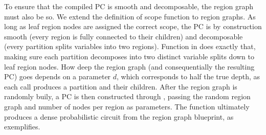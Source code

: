 To ensure that the compiled PC is smooth and decomposable, the region graph must also be so. We
extend the definition of scope function to region graphs. As long as leaf region nodes are assigned
the correct scope, the PC is by construction smooth (every region is fully connected to their
children) and decomposable (every partition splits variables into two regions). Function
 in  does exactly that, making sure each partition
decomposes into two distinct variable splits down to leaf region nodes. How deep the region graph
(and consequentially the resulting PC) goes depends on a parameter $d$, which corresponds to half
the true depth, as each  call produces a partition and their children. After
the region graph is randomly buily, a PC is then constructed through ,
passing the random region graph and number of nodes per region as parameters. The function
ultimately produces a dense probabilistic circuit from the region graph blueprint, as
 exemplifies.

